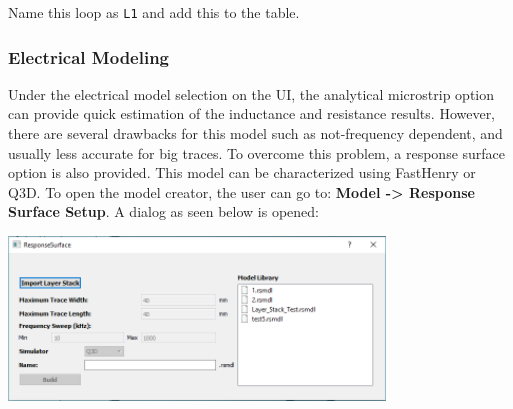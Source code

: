 \documentclass[11pt]{article}
\begin{document}
Name this loop as \texttt{L1} and add this to the table.

\subsubsection{Electrical Modeling}
\label{sec-2-5-5}

Under the electrical model selection on the UI, the analytical microstrip option can provide quick estimation of the inductance and resistance results. However, there are several drawbacks for this model such as not-frequency dependent, and usually less accurate for big traces. To overcome this problem, a response surface option is also provided. This model can be characterized using FastHenry or Q3D. To open the model creator, the user can go to: \textbf{Model -> Response Surface Setup}. A dialog as seen below is opened:

\begin{center}
\includegraphics[width=10cm]{./figs/21_Emodel.png}
\end{center}
\end{document}
